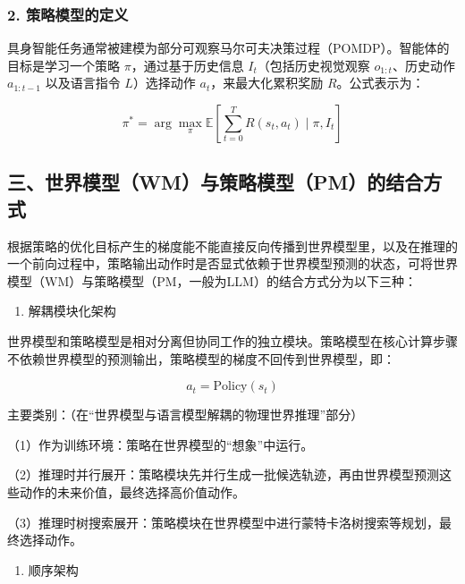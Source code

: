 \hypertarget{ux7b56ux7565ux6a21ux578bux7684ux5b9aux4e49}{%
\subsubsection{2. 策略模型的定义}\label{ux7b56ux7565ux6a21ux578bux7684ux5b9aux4e49}}

具身智能任务通常被建模为部分可观察马尔可夫决策过程（POMDP）。智能体的目标是学习一个策略 \(\pi\)，通过基于历史信息 \(I_t\)（包括历史视觉观察 \(o_{1:t}\)、历史动作 \(a_{1:t-1}\) 以及语言指令 \(L\)）选择动作 \(a_t\)，来最大化累积奖励 \(R\)。公式表示为：

\[
\pi^* = \arg\max_{\pi}\mathbb{E}\left[\sum_{t=0}^{T} R(s_t, a_t)\mid \pi, I_t\right]
\]

\hypertarget{ux4e09ux4e16ux754cux6a21ux578bwmux4e0eux7b56ux7565ux6a21ux578bpmux7684ux7ed3ux5408ux65b9ux5f0f}{%
\subsection{三、世界模型（WM）与策略模型（PM）的结合方式}\label{ux4e09ux4e16ux754cux6a21ux578bwmux4e0eux7b56ux7565ux6a21ux578bpmux7684ux7ed3ux5408ux65b9ux5f0f}}

根据策略的优化目标产生的梯度能不能直接反向传播到世界模型里，以及在推理的一个前向过程中，策略输出动作时是否显式依赖于世界模型预测的状态，可将世界模型（WM）与策略模型（PM，一般为LLM）的结合方式分为以下三种：

\begin{enumerate}
\def\labelenumi{\arabic{enumi}.}
\tightlist
\item
  解耦模块化架构
\end{enumerate}

世界模型和策略模型是相对分离但协同工作的独立模块。策略模型在核心计算步骤不依赖世界模型的预测输出，策略模型的梯度不回传到世界模型，即：

\[
a_t = \mathrm{Policy}(s_t)
\]

主要类别：（在``世界模型与语言模型解耦的物理世界推理''部分）

（1）作为训练环境：策略在世界模型的``想象''中运行。

（2）推理时并行展开：策略模块先并行生成一批候选轨迹，再由世界模型预测这些动作的未来价值，最终选择高价值动作。

（3）推理时树搜索展开：策略模块在世界模型中进行蒙特卡洛树搜索等规划，最终选择动作。

\begin{enumerate}
\def\labelenumi{\arabic{enumi}.}
\setcounter{enumi}{1}
\tightlist
\item
  顺序架构
\end{enumerate}

